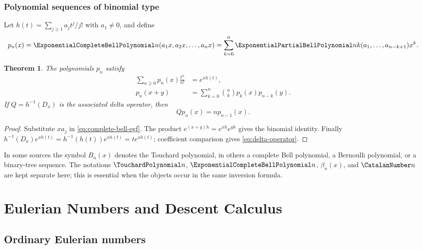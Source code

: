 \documentclass[11pt,a4paper,oneside,openany]{book}
\newtheorem{theorem}{Theorem}[chapter]
\theoremstyle{definition}
\theoremstyle{remark}
\begin{document}
\section{Polynomial sequences of binomial type}
Let
$h(t)=\sum_{j\ge1}a_jt^j/j!$ with $a_1\ne0$, and define
\begin{equation}\label{eq:binomial-type-bell}
 p_n(x)=\ExponentialCompleteBellPolynomial n(a_1x,a_2x,\ldots,a_nx)
 =\sum_{k=0}^{n}\ExponentialPartialBellPolynomial nk(a_1,\ldots,a_{n-k+1})x^k.
\end{equation}

\begin{theorem}\label{thm:binomial-type-bell}
The polynomials $p_n$ satisfy
\begin{align}
 \sum_{n\ge0}p_n(x)\frac{t^n}{n!}&=e^{xh(t)},
 \label{eq:binomial-type-egf}\\
 p_n(x+y)&=\sum_{k=0}^{n}\binom nkp_k(x)p_{n-k}(y).
 \label{eq:binomial-type-identity}
\end{align}
If $Q=h^{-1}(D_x)$ is the associated delta operator, then
\begin{equation}\label{eq:delta-operator}
 Qp_n(x)=np_{n-1}(x).
\end{equation}
\end{theorem}
\begin{proof}
Substitute $x a_j$ in \eqref{eq:complete-bell-egf}.  The product
$e^{(x+y)h}=e^{xh}e^{yh}$ gives the binomial identity.  Finally
$h^{-1}(D_x)e^{xh(t)}=h^{-1}(h(t))e^{xh(t)}=t e^{xh(t)}$; coefficient comparison
gives \eqref{eq:delta-operator}.
\end{proof}

\begin{auditbox}
In some sources the symbol $B_n(x)$ denotes the Touchard polynomial, in others a
complete Bell polynomial, a Bernoulli polynomial, or a binary-tree sequence.  The
notations $\TouchardPolynomial n$, $\ExponentialCompleteBellPolynomial n$, $\beta_n(x)$, and $\CatalanNumber n$ are kept separate here; this
is essential when the objects occur in the same inversion formula.
\end{auditbox}

\part{Eulerian Numbers and Descent Calculus}

\chapter{Ordinary Eulerian numbers}
\end{document}
